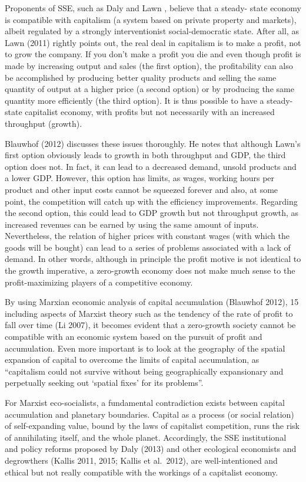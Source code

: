\documentclass[
]{book}
\begin{document}
Proponents of SSE, such as Daly and Lawn , believe that a steady-
state economy is compatible with capitalism (a system based on private property and markets), albeit regulated
by a strongly interventionist social-democratic state. After all, as Lawn (2011) rightly points out, the real deal
in capitalism is to make a profit, not to grow the company.
If you don't make a profit you die and even though
profit is made by increasing output and sales (the first option), the profitability can also be accomplished by
producing better quality products and selling the same quantity of output at a higher price (a second option) or
by producing the same quantity more efficiently (the third option). It is thus possible to have a steady-state
capitalist economy, with profits but not necessarily with an increased throughput (growth).

Blauwhof (2012) discusses these issues thoroughly. He notes that although Lawn's first option obviously
leads to growth in both throughput and GDP, the third option does not. In fact, it can lead to a decreased demand,
unsold products and a lower GDP. However, this option has limits, as wages, working hours per product and
other input costs cannot be squeezed forever and also, at some point, the competition will catch up with the
efficiency improvements. Regarding the second option, this could lead to GDP growth but not throughput
growth, as increased revenues can be earned by using the same amount of inputs. Nevertheless, the relation of
higher prices with constant wages (with which the goods will be bought) can lead to a series of problems
associated with a lack of demand. In other words, although in principle the profit motive is not identical to the
growth imperative, a zero-growth economy does not make much sense to the profit-maximizing players of a
competitive economy.

By using Marxian economic analysis of capital accumulation (Blauwhof 2012), 15 including aspects of
Marxist theory such as the tendency of the rate of profit to fall over time (Li 2007), it becomes evident that a
zero-growth society cannot be compatible with an economic system based on the pursuit of profit and
accumulation. Even more important is to look at the geography of the spatial expansion of capital to overcome
the limits of capital accumulation, as ``capitalism could not survive without being geographically expansionary
and perpetually seeking out `spatial fixes' for its problems''.

For Marxist eco-socialists, a
fundamental contradiction exists between capital accumulation and planetary boundaries. Capital as a process
(or social relation) of self-expanding value, bound by the laws of capitalist competition, runs the risk of
annihilating itself, and the whole planet.
Accordingly, the SSE institutional and policy
reforms proposed by Daly (2013) and other ecological economists and degrowthers (Kallis 2011, 2015; Kallis
et al.~2012), are well-intentioned and ethical but not really compatible with the workings of a capitalist economy.
\end{document}
